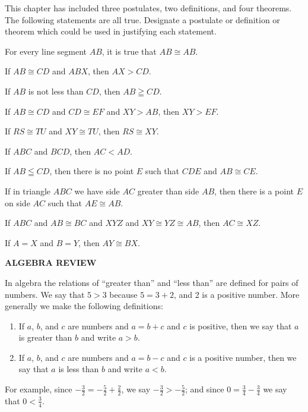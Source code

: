 \documentclass[11pt]{book}
\theoremstyle{bkplain}
\newcommand{\IVhead}[1]{%
  \par\bigskip\begin{center}\bfseries\large\MakeUppercase{#1}\end{center}%
  \par\nopagebreak\medskip}
\theoremstyle{XIplainnote}
\theoremstyle{bkplain}
\theoremstyle{bkplain}
\begin{document}
\begin{exercisecols}
\medskip
This chapter has included three postulates, two definitions, and four theorems.
The following statements are all true. Designate a postulate or definition or
theorem which could be used in justifying each statement.

\begin{exlist}[start=11]
\item For every line segment $AB$, it is true that $AB \cong AB$.
\item If $AB \cong CD$ and $ABX$, then $AX > CD$.
\item If $AB$ is not less than $CD$, then $AB \geqq CD$.
\item If $AB \cong CD$ and $CD \cong EF$ and $XY > AB$, then $XY > EF$.
\item If $RS \cong TU$ and $XY \cong TU$, then $RS \cong XY$.
\item If $ABC$ and $BCD$, then $AC < AD$.
\item If $AB \leqq CD$, then there is no point $E$ such that $CDE$ and
      $AB \cong CE$.
\item If in triangle $ABC$ we have side $AC$ greater than side $AB$, then there
      is a point $E$ on side $AC$ such that $AE \cong AB$.
\item If $ABC$ and $AB \cong BC$ and $XYZ$ and $XY \cong YZ \cong AB$, then
      $AC \cong XZ$.
\item If $A = X$ and $B = Y$, then $AY \cong BX$.
\end{exlist}

\IVhead{Algebra Review}

In algebra the relations of ``greater than'' and ``less than'' are defined for
pairs of numbers. We say that $5 > 3$ because $5 = 3 + 2$, and 2 is a positive
number. More generally we make the following definitions:

\begin{enumerate}[label=(\arabic*), leftmargin=2.2em, itemsep=2pt, topsep=3pt]
\item If $a$, $b$, and $c$ are numbers and $a = b + c$ and $c$ is positive, then
      we say that $a$ is greater than $b$ and write $a > b$.
\item If $a$, $b$, and $c$ are numbers and $a = b - c$ and $c$ is a positive
      number, then we say that $a$ is less than $b$ and write $a < b$.
\end{enumerate}

For example, since $-\frac{3}{2} = -\frac{5}{2} + \frac{2}{2}$, we say
$-\frac{3}{2} > -\frac{5}{2}$; and since $0 = \frac{3}{4} - \frac{3}{4}$ we say
that $0 < \frac{3}{4}$.


\end{exercisecols}
\end{document}

